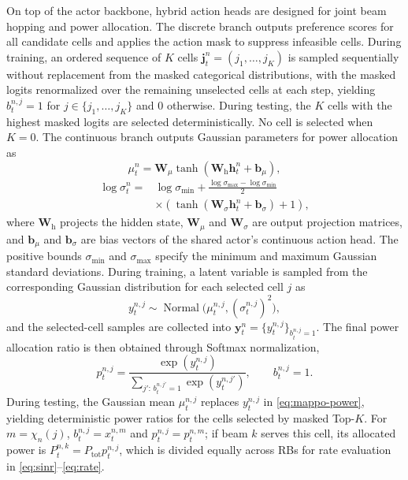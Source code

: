 \documentclass[journal]{IEEEtran}
\begin{document}
On top of the actor backbone, hybrid action heads are designed for joint beam hopping and power allocation. The discrete branch outputs preference scores for all candidate cells and applies the action mask to suppress infeasible cells. During training, an ordered sequence of $K$ cells $\mathbf j_t^n=(j_1,\ldots,j_K)$ is sampled sequentially without replacement from the masked categorical distributions, with the masked logits renormalized over the remaining unselected cells at each step, yielding $b_t^{n,j}=1$ for $j\in\{j_1,\ldots,j_K\}$ and $0$ otherwise. During testing, the $K$ cells with the highest masked logits are selected deterministically. No cell is selected when $K=0$. The continuous branch outputs Gaussian parameters for power allocation as
\begin{equation}
\mu_t^n=\mathbf W_{\mu}\tanh(\mathbf W_{\mathrm{h}}\mathbf h_t^n+\mathbf b_{\mu}),
\label{eq:mappo-mu}
\end{equation}
\begin{equation}
\begin{aligned}
\log\sigma_t^n={}&\log\sigma_{\min}+\frac{\log\sigma_{\max}-\log\sigma_{\min}}{2}\\
&\times\left(\tanh(\mathbf W_{\sigma}\mathbf h_t^n+\mathbf b_{\sigma})+1\right),
\end{aligned}
\label{eq:mappo-logsigma}
\end{equation}
where $\mathbf W_{\mathrm{h}}$ projects the hidden state, $\mathbf W_{\mu}$ and $\mathbf W_{\sigma}$ are output projection matrices, and $\mathbf b_{\mu}$ and $\mathbf b_{\sigma}$ are bias vectors of the shared actor's continuous action head. The positive bounds $\sigma_{\min}$ and $\sigma_{\max}$ specify the minimum and maximum Gaussian standard deviations.
During training, a latent variable is sampled from the corresponding Gaussian distribution for each selected cell $j$ as
\begin{equation}
y_t^{n,j}\sim\operatorname{Normal}\big(\mu_t^{n,j},(\sigma_t^{n,j})^2\big),
\end{equation}
and the selected-cell samples are collected into $\mathbf y_t^n=\{y_t^{n,j}\}_{b_t^{n,j}=1}$. The final power allocation ratio is then obtained through Softmax normalization,
\begin{equation}
p_t^{n,j}=
\frac{\exp(y_t^{n,j})}
{\sum_{j':\,b_t^{n,j'}=1}\exp(y_t^{n,j'})},
\qquad b_t^{n,j}=1.
\label{eq:mappo-power}
\end{equation}
During testing, the Gaussian mean $\mu_t^{n,j}$ replaces $y_t^{n,j}$ in \eqref{eq:mappo-power}, yielding deterministic power ratios for the cells selected by masked Top-$K$.
For $m=\chi_n(j)$, $b_t^{n,j}=x_t^{n,m}$ and $p_t^{n,j}=p_t^{n,m}$; if beam $k$ serves this cell, its allocated power is $P_t^{n,k}=P_{\mathrm{tot}}p_t^{n,j}$, which is divided equally across RBs for rate evaluation in \eqref{eq:sinr}--\eqref{eq:rate}.
\end{document}
